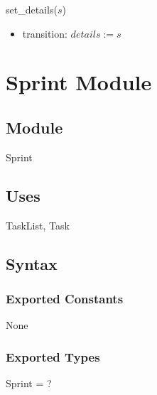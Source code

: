 \documentclass[12pt, titlepage]{article}
\begin{document}
\noindent set\_details($s$)
\begin{itemize}
    \item transition: $details := s$
\end{itemize}

\newpage

\section* {Sprint Module}

\subsection*{Module}
Sprint

\subsection* {Uses}
TaskList, Task 

\subsection* {Syntax}
\subsubsection* {Exported Constants}
None

\subsubsection* {Exported Types}
Sprint = ?
\end{document}
